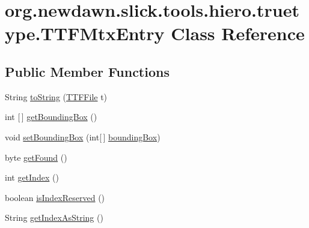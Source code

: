 \hypertarget{classorg_1_1newdawn_1_1slick_1_1tools_1_1hiero_1_1truetype_1_1_t_t_f_mtx_entry}{}\section{org.\+newdawn.\+slick.\+tools.\+hiero.\+truetype.\+T\+T\+F\+Mtx\+Entry Class Reference}
\label{classorg_1_1newdawn_1_1slick_1_1tools_1_1hiero_1_1truetype_1_1_t_t_f_mtx_entry}
\subsection*{Public Member Functions}
\begin{DoxyCompactItemize}
\item 
String \mbox{\hyperlink{classorg_1_1newdawn_1_1slick_1_1tools_1_1hiero_1_1truetype_1_1_t_t_f_mtx_entry_ab0d868c71b601cf0ff1006410767236f}{to\+String}} (\mbox{\hyperlink{classorg_1_1newdawn_1_1slick_1_1tools_1_1hiero_1_1truetype_1_1_t_t_f_file}{T\+T\+F\+File}} t)
\item 
int \mbox{[}$\,$\mbox{]} \mbox{\hyperlink{classorg_1_1newdawn_1_1slick_1_1tools_1_1hiero_1_1truetype_1_1_t_t_f_mtx_entry_ad9549a7740d3eb24d72c6351b047e3aa}{get\+Bounding\+Box}} ()
\item 
void \mbox{\hyperlink{classorg_1_1newdawn_1_1slick_1_1tools_1_1hiero_1_1truetype_1_1_t_t_f_mtx_entry_a1e76e1cf4209d95f2cee2ded1904147a}{set\+Bounding\+Box}} (int\mbox{[}$\,$\mbox{]} \mbox{\hyperlink{classorg_1_1newdawn_1_1slick_1_1tools_1_1hiero_1_1truetype_1_1_t_t_f_mtx_entry_a7a0560528ae8fca8245ac8ee8de2714e}{bounding\+Box}})
\item 
byte \mbox{\hyperlink{classorg_1_1newdawn_1_1slick_1_1tools_1_1hiero_1_1truetype_1_1_t_t_f_mtx_entry_a39f29940a581af42afa410254f738661}{get\+Found}} ()
\item 
int \mbox{\hyperlink{classorg_1_1newdawn_1_1slick_1_1tools_1_1hiero_1_1truetype_1_1_t_t_f_mtx_entry_a81326d1275e3ec5e754e4d8f51a59284}{get\+Index}} ()
\item 
boolean \mbox{\hyperlink{classorg_1_1newdawn_1_1slick_1_1tools_1_1hiero_1_1truetype_1_1_t_t_f_mtx_entry_a41f4ce85bd52d1e53e6af7ecc93012cb}{is\+Index\+Reserved}} ()
\item 
String \mbox{\hyperlink{classorg_1_1newdawn_1_1slick_1_1tools_1_1hiero_1_1truetype_1_1_t_t_f_mtx_entry_ac71cda0a4e0b8aa11edfe164ab6eb921}{get\+Index\+As\+String}} ()
\item 

\end{DoxyCompactItemize}

